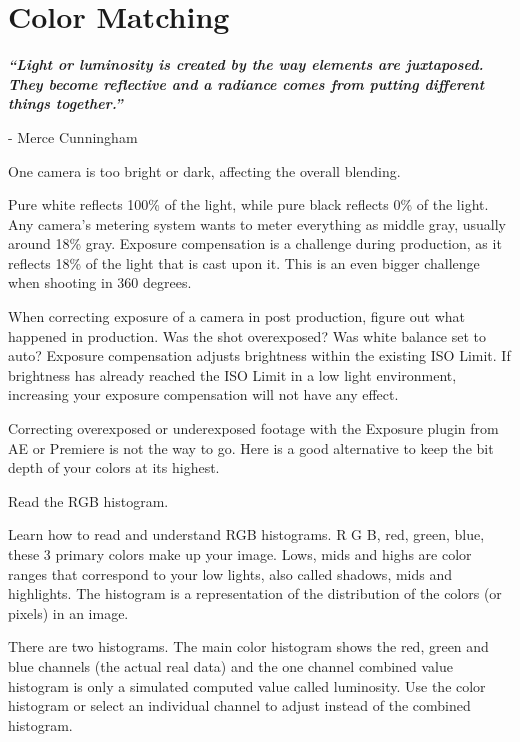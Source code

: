 \section{Color Matching}
\pagecolor{white}
\label{chap:32}
\begin{fullwidth}

{\itshape\bfseries “Light or luminosity is created by the way elements are juxtaposed. They become reflective and a radiance comes from putting different things together.”}

- Merce Cunningham
\vspace{\baselineskip}

\problem

{\large One camera is too bright or dark, affecting the overall blending. \par}

Pure white reflects 100\% of the light, while pure black reflects 0\% of the light. Any camera’s metering system wants to meter everything as middle gray, usually around 18\% gray. Exposure compensation is a challenge during production, as it reflects 18\% of the light that is cast upon it. This is an even bigger challenge when shooting in 360 degrees. 

When correcting exposure of a camera in post production, figure out what happened in production. Was the shot overexposed? Was white balance set to auto? Exposure compensation adjusts brightness within the existing ISO Limit. If brightness has already reached the ISO Limit in a low light environment, increasing your exposure compensation will not have any effect.


Correcting overexposed or underexposed footage with the Exposure plugin from AE or Premiere is not the way to go. Here is a good alternative to keep the bit depth of your colors at its highest.

\clearpage
\solution

{\large Read the RGB histogram. \par}


Learn how to read and understand RGB histograms. R G B, red, green, blue, these 3 primary colors make up your image. Lows, mids and highs are color ranges that correspond to your low lights, also called shadows, mids and highlights. The histogram is a representation of the distribution of the colors (or pixels) in an image. 

There are two histograms. The main color histogram shows the red, green and blue channels (the actual real data) and the one channel combined value histogram is only a simulated computed value called luminosity. Use the color histogram or select an individual channel to adjust instead of the combined histogram.


\end{fullwidth}
